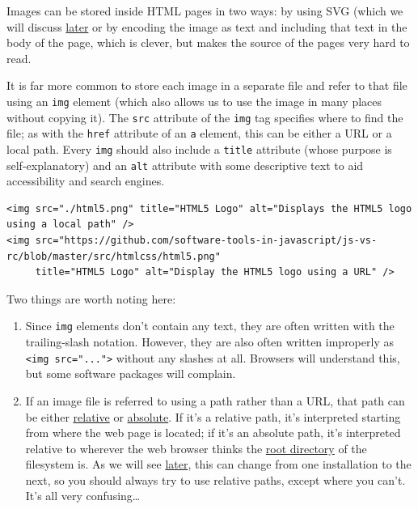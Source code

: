 Images can be stored inside HTML pages in two ways: by using SVG (which
we will discuss \protect\hyperlink{s:vis}{later} or by encoding the
image as text and including that text in the body of the page, which is
clever, but makes the source of the pages very hard to read.

It is far more common to store each image in a separate file and refer
to that file using an \texttt{img} element (which also allows us to use
the image in many places without copying it). The \texttt{src} attribute
of the \texttt{img} tag specifies where to find the file; as with the
\texttt{href} attribute of an \texttt{a} element, this can be either a
URL or a local path. Every \texttt{img} should also include a
\texttt{title} attribute (whose purpose is self-explanatory) and an
\texttt{alt} attribute with some descriptive text to aid accessibility
and search engines.

\begin{verbatim}
<img src="./html5.png" title="HTML5 Logo" alt="Displays the HTML5 logo using a local path" />
<img src="https://github.com/software-tools-in-javascript/js-vs-rc/blob/master/src/htmlcss/html5.png"
     title="HTML5 Logo" alt="Display the HTML5 logo using a URL" />
\end{verbatim}

Two things are worth noting here:

\begin{enumerate}
\tightlist
\item
  Since \texttt{img} elements don't contain any text, they are often
  written with the trailing-slash notation. However, they are also often
  written improperly as \texttt{\textless{}img\ src="..."\textgreater{}}
  without any slashes at all. Browsers will understand this, but some
  software packages will complain.
\item
  If an image file is referred to using a path rather than a URL, that
  path can be either \protect\hyperlink{g:relative-path}{relative} or
  \protect\hyperlink{g:absolute-path}{absolute}. If it's a relative
  path, it's interpreted starting from where the web page is located; if
  it's an absolute path, it's interpreted relative to wherever the web
  browser thinks the \protect\hyperlink{g:root-directory}{root
  directory} of the filesystem is. As we will see
  \protect\hyperlink{s:server}{later}, this can change from one
  installation to the next, so you should always try to use relative
  paths, except where you can't. It's all very confusing\ldots{}
\end{enumerate}

